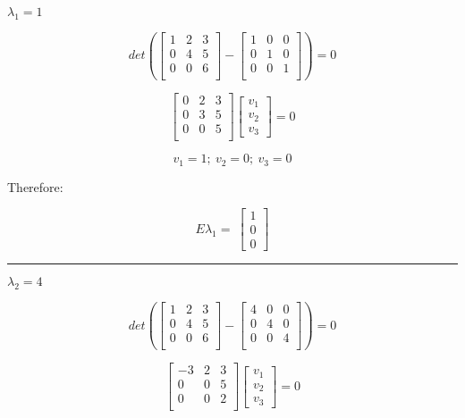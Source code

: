 \documentclass[]{article}
\begin{document}
\(\lambda_1 = 1\)

\[
det( 
\begin{bmatrix}
   1 & 2 & 3 \\
   0 & 4 & 5 \\
   0 & 0 & 6 \\
\end{bmatrix}
-
\begin{bmatrix}
   1 & 0 & 0 \\
   0 & 1  & 0 \\
   0 & 0 & 1 \\
\end{bmatrix}
) = 0
\]

\[
\begin{bmatrix}
   0 & 2 & 3 \\
   0 & 3 & 5 \\
   0 & 0 & 5 \\
\end{bmatrix}
\begin{bmatrix}
v_1 \\
v_2 \\
v_3
\end{bmatrix}
=0
\]

\[v_1 = 1;~v_2 = 0;~v_3 = 0\]

Therefore:

\[
E\lambda_1 = \
\begin{bmatrix}
1 \\
0 \\
0
\end{bmatrix}
\]

\begin{center}\rule{0.5\linewidth}{\linethickness}\end{center}

\(\lambda_2 = 4\)

\[
det( 
\begin{bmatrix}
   1 & 2 & 3 \\
   0 & 4 & 5 \\
   0 & 0 & 6 \\
\end{bmatrix}
-
\begin{bmatrix}
   4 & 0 & 0 \\
   0 & 4  & 0 \\
   0 & 0 & 4 \\
\end{bmatrix}
) = 0
\]

\[
\begin{bmatrix}
   -3 & 2 & 3 \\
   0 & 0 & 5 \\
   0 & 0 & 2 \\
\end{bmatrix}
\begin{bmatrix}
v_1 \\
v_2 \\
v_3
\end{bmatrix}
=0
\]
\end{document}
